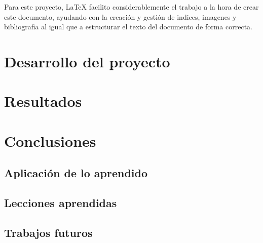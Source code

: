 \documentclass[a4paper, 12pt]{book}
\begin{document}
Para este proyecto, LaTeX facilito considerablemente el trabajo a la hora de crear este documento, ayudando con la creación y gestión de indices, imagenes y bibliografia al igual que a estructurar el texto del documento de forma correcta.

\cleardoublepage
\chapter{Desarrollo del proyecto}
\label{chap:Desarrollo del proyecto}



\cleardoublepage
\chapter{Resultados}
\label{chap:resultados}



\cleardoublepage
\chapter{Conclusiones}
\label{chap:conclusiones}


\section{Aplicación de lo aprendido}
\label{sec:aplicacion}



\section{Lecciones aprendidas}
\label{sec:lecciones_aprendidas}


\section{Trabajos futuros}
\label{sec:trabajos_futuros}


\cleardoublepage


 
\end{document}
